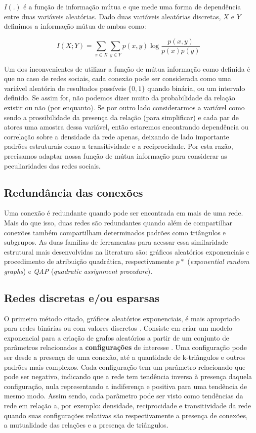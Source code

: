 $I(.)$ é a função de informação mútua e que mede uma forma de dependência entre
duas variáveis aleatórias. Dado duas variáveis aleatórias discretas, $X$ e $Y$
definimos a informação mútua de ambas como:

\begin{equation}
\label{def:inf_mutua}
I(X;Y) = \sum_{x\in X}\sum_{y\in Y}p(x,y)\log \frac{p(x,y)}{p(x)p(y)}
\end{equation}

Um dos inconvenientes de utilizar a função de mútua informação como definida é
que no caso de redes sociais, cada conexão pode ser considerada como uma
variável aleatória de resultados possíveis $\{0,1\}$ quando binária, ou um
intervalo definido. Se assim for, não podemos dizer muito da probabilidade da
relação existir ou não (por enquanto). Se por outro lado considerarmos a
variável como sendo a prossibilidade da presença da relação (para simplificar) e
cada par de atores uma amostra dessa variável, então estaremos encontrando
dependência ou correlação sobre a densidade da rede apenas, deixando de lado
importante padrões estruturais como a transitividade e a reciprocidade. Por esta
razão, precisamos adaptar nossa função de mútua informação para considerar as
peculiaridades das redes sociais. 

\subsection{Redundância das conexões}

Uma conexão é redundante quando pode ser encontrada em mais de uma rede. Mais do
que isso, duas redes são redundantes quando além de compartilhar conexões também
compartilham determinados padrões como triângulos e subgrupos. As duas
famílias de ferramentas para acessar essa similaridade estrutural mais
desenvolvidas na literatura são: gráficos aleatórios exponenciais e procedimento
de atribuição quadrática, respectivamente $p*$ (\emph{exponential random
graphs}) e \emph{QAP} (\emph{quadratic assignment procedure}).

\subsection{Redes discretas e/ou esparsas}

O primeiro método citado, gráficos aleatórios exponenciais, é mais apropriado
para redes binárias ou com valores discretos \citep{Dekker2007}. Consiste em
criar um modelo exponencial para a criação de grafos aleatórios a partir de um
conjunto de parâmetros relacionados a \textbf{configurações} de interesse
\citep{ROBINS2007a}. Uma configuração pode ser desde a presença de uma conexão,
até a quantidade de k-triângulos e outros padrões mais complexos. Cada
configuração tem um parâmetro relacionado que pode ser negativo, indicando que a
rede tem tendência inversa à presença daquela configuração, nula representando a
indiferença e positiva para uma tendência de mesmo modo. Assim sendo, cada
parâmetro pode ser visto como tendências da rede em relação a, por exemplo:
densidade, reciprocidade e transitividade da rede quando suas configurações
relativas são respectivamente a presença de conexões, a mutualidade das relações
e a presença de triângulos.

